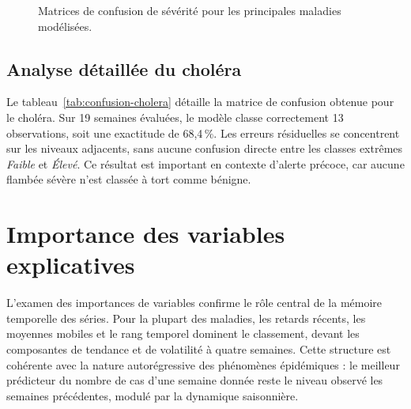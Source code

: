 \begin{figure}[htbp]
  \centering
  \caption{Matrices de confusion de sévérité pour les principales maladies modélisées.}
  \label{fig:confusion}
\end{figure}

\subsection{Analyse détaillée du choléra}

Le tableau~\ref{tab:confusion-cholera} détaille la matrice de confusion obtenue pour
le choléra. Sur 19 semaines évaluées, le modèle classe correctement 13 observations,
soit une exactitude de 68,4\,\%. Les erreurs résiduelles se concentrent sur les
niveaux adjacents, sans aucune confusion directe entre les classes extrêmes
\textit{Faible} et \textit{Élevé}. Ce résultat est important en contexte d'alerte
précoce, car aucune flambée sévère n'est classée à tort comme bénigne.

\begin{table}[htbp]
  \centering
  \caption{Matrice de confusion du niveau de sévérité pour le choléra.}
  \label{tab:confusion-cholera}
\end{table}

\section{Importance des variables explicatives}

L'examen des importances de variables confirme le rôle central de la mémoire
temporelle des séries. Pour la plupart des maladies, les retards récents, les
moyennes mobiles et le rang temporel dominent le classement, devant les composantes
de tendance et de volatilité à quatre semaines. Cette structure est cohérente avec
la nature autorégressive des phénomènes épidémiques : le meilleur prédicteur du
nombre de cas d'une semaine donnée reste le niveau observé les semaines précédentes,
modulé par la dynamique saisonnière.

